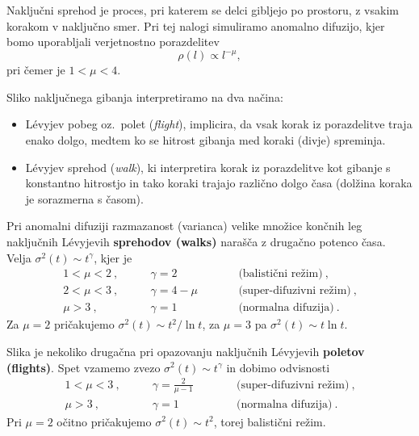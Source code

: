 \documentclass[12pt]{article}
\begin{document}

\addtocounter{page}{1}

\newpage
Naključni sprehod je proces, pri katerem se delci gibljejo po prostoru, z vsakim korakom v naključno smer. Pri tej nalogi simuliramo anomalno difuzijo, kjer bomo uporabljali verjetnostno porazdelitev
\begin{equation}
    \rho(l) \propto l^{-\mu},
    \label{eq:rho}
\end{equation}
pri čemer je $1 < \mu < 4$.

Sliko naključnega gibanja interpretiramo na dva načina:
\begin{itemize}
    \item L\'evyjev pobeg oz.\ polet ({\sl flight\/}), implicira, da vsak korak iz
          porazdelitve traja enako dolgo, medtem ko se hitrost gibanja med koraki (divje) spreminja.
    \item L\'evyjev sprehod ({\sl walk\/}), ki interpretira korak iz porazdelitve kot  gibanje s konstantno hitrostjo in
          tako koraki trajajo različno dolgo časa (dolžina koraka je sorazmerna s časom).
\end{itemize}
Pri anomalni difuziji razmazanost (varianca) velike množice
končnih leg naključnih L\'evyjevih \textbf{sprehodov (walks)} narašča z drugačno potenco časa.
Velja $\sigma^2(t) \sim t^\gamma$, kjer je
\begin{align*}
    1 < \mu < 2 \>, & \qquad \gamma = 2 \>    & \qquad & \text{(balistični režim)}\>,      \\
    2 < \mu < 3 \>, & \qquad \gamma = 4 - \mu & \qquad & \text{(super-difuzivni režim)}\>, \\
    \mu > 3 \>,     & \qquad \gamma = 1       & \qquad & \text{(normalna difuzija)} \>.
\end{align*}
Za $\mu=2$ pričakujemo $\sigma^2(t) \sim t^2 / \ln t$,
za $\mu=3$ pa $\sigma^2(t) \sim t \ln t$.

Slika je nekoliko drugačna pri opazovanju naključnih L\'evyjevih \textbf{poletov (flights)}.
Spet vzamemo zvezo $\sigma^2(t) \sim t^\gamma$ in dobimo odvisnosti
\begin{align*}
    1 < \mu < 3 \>, & \qquad \gamma = \frac{2}{\mu-1} \> & \qquad & \text{(super-difuzivni režim)}\>, \\
    \mu > 3 \>,     & \qquad \gamma = 1                  & \qquad & \text{(normalna difuzija)} \>.
\end{align*}
Pri $\mu=2$ očitno pričakujemo $\sigma^2(t) \sim t^2 $, torej balistični režim.
\end{document}
